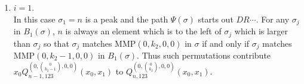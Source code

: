 \documentclass[
final,nomarks
]{dmtcs-episciences}
\newcommand{\Qmzn}[3]{Q_{#3,123}^{(0,\binom{#1}{#2},0,0)}(x_0,x_1)}
\newcommand{\MMP}{\mathrm{MMP}}
\begin{document}
\begin{enumerate}[{\bf Case }\bf 1.]
	\item \begin{math}i=1\end{math}.\\
	In this case \begin{math}\sigma_1=n\end{math} is a peak and the path \begin{math}\Psi(\sigma)\end{math} starts out \begin{math}DR \cdots \end{math}. 
	For any \begin{math}\sigma_j\end{math} in \begin{math}B_1(\sigma)\end{math}, \begin{math}n\end{math} is 
	always an element which is to the left of \begin{math}\sigma_j\end{math} which is larger than \begin{math}\sigma_j\end{math} so 
	that \begin{math}\sigma_j\end{math} matches  \begin{math}\MMP(0,k_2,0,0)\end{math} in \begin{math}\sigma\end{math} if and only if 
	\begin{math}\sigma_j\end{math} matches  \begin{math}\MMP(0,k_2-1,0,0)\end{math} in \begin{math}B_1(\sigma)\end{math}. Thus such permutations 
	contribute \begin{math}x_0\Qmzn{0}{k_2-1}{n-1}\end{math} to \begin{math}\Qmzn{0}{k_2}{n}\end{math}.
	

\end{enumerate}
\end{document}
